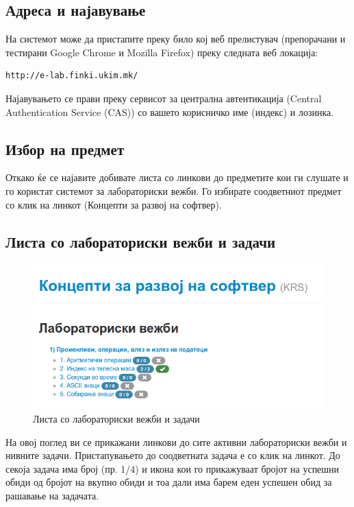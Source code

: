 \subsection{Адреса и најавување}

На системот може да пристапите преку било кој веб прелистувач (препорачани и
тестирани Google Chrome и Mozilla Firefox) преку следната веб локација:

\begin{verbatim}
http://e-lab.finki.ukim.mk/
\end{verbatim}

Најавувањето се прави преку сервисот за централна автентикација (Central
Authentication Service (CAS)) со вашето корисничко име (индекс) и лозинка.

\subsection{Избор на предмет}

Откако ќе се најавите добивате листа со линкови до предметите кои ги слушате и
го користат системот за лабораториски вежби. Го избирате соодветниот предмет со
клик на линкот (Концепти за развој на софтвер).

\subsection{Листа со лабораториски вежби и задачи}

\begin{figure}[htbp]
\centering
\includegraphics[scale=.5]{images/elab/krs}
\caption{Листа со лабораториски вежби и задачи}
\end{figure}

На овој поглед ви се прикажани линкови до сите активни лабораториски вежби и
нивните задачи. Пристапувањето до соодветната задача е со клик на линкот. До
секоја задача има број (пр. 1/4) и икона кои го прикажуваат бројот на успешни
обиди од бројот на вкупно обиди и тоа дали има барем еден успешен обид за
рашавање на задачата.

